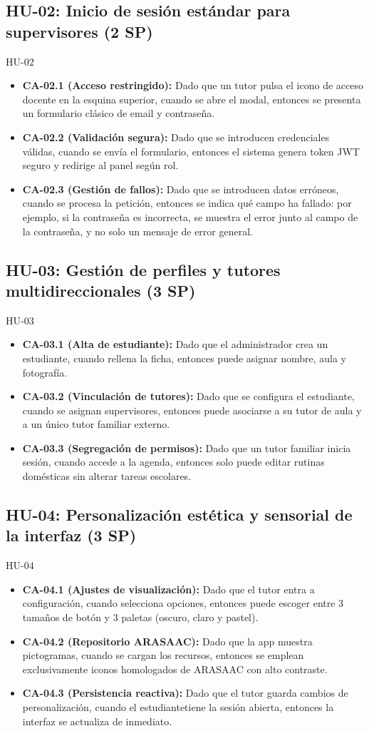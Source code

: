 \documentclass[11pt,a4paper]{article}
\newcommand{\ca}[2]{\item \textbf{#1:} #2}
\begin{document}
\subsection{HU-02: Inicio de sesión estándar para supervisores (2 SP)}
\begin{criterios}{HU-02}
\begin{itemize}
\ca{CA-02.1 (Acceso restringido)}{Dado que un tutor pulsa el icono de acceso docente en la esquina superior, cuando se abre el modal, entonces se presenta un formulario clásico de email y contraseña.}
\ca{CA-02.2 (Validación segura)}{Dado que se introducen credenciales válidas, cuando se envía el formulario, entonces el sistema genera token JWT seguro y redirige al panel según rol.}
\ca{CA-02.3 (Gestión de fallos)}{Dado que se introducen datos erróneos, cuando se procesa la petición, entonces se indica qué campo ha fallado: por ejemplo, si la contraseña es incorrecta, se muestra el error junto al campo de la contraseña, y no solo un mensaje de error general.}
\end{itemize}
\end{criterios}

\subsection{HU-03: Gestión de perfiles y tutores multidireccionales (3 SP)}
\begin{criterios}{HU-03}
\begin{itemize}
\ca{CA-03.1 (Alta de estudiante)}{Dado que el administrador crea un estudiante, cuando rellena la ficha, entonces puede asignar nombre, aula y fotografía.}
\ca{CA-03.2 (Vinculación de tutores)}{Dado que se configura el estudiante, cuando se asignan supervisores, entonces puede asociarse a su tutor de aula y a un único tutor familiar externo.}
\ca{CA-03.3 (Segregación de permisos)}{Dado que un tutor familiar inicia sesión, cuando accede a la agenda, entonces solo puede editar rutinas domésticas sin alterar tareas escolares.}
\end{itemize}
\end{criterios}

\subsection{HU-04: Personalización estética y sensorial de la interfaz (3 SP)}
\begin{criterios}{HU-04}
\begin{itemize}
\ca{CA-04.1 (Ajustes de visualización)}{Dado que el tutor entra a configuración, cuando selecciona opciones, entonces puede escoger entre 3 tamaños de botón y 3 paletas (oscuro, claro y pastel).}
\ca{CA-04.2 (Repositorio ARASAAC)}{Dado que la app muestra pictogramas, cuando se cargan los recursos, entonces se emplean exclusivamente iconos homologados de ARASAAC con alto contraste.}
\ca{CA-04.3 (Persistencia reactiva)}{Dado que el tutor guarda cambios de personalización, cuando el estudiantetiene la sesión abierta, entonces la interfaz se actualiza de inmediato.}
\end{itemize}
\end{criterios}
\end{document}
